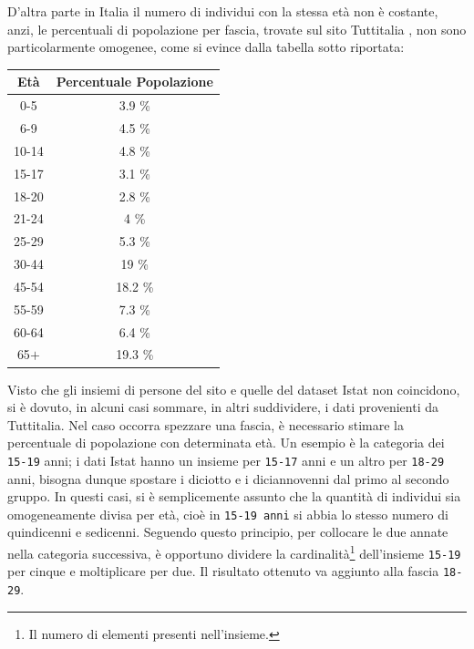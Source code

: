 \documentclass[a4paper]{report}
\newcommand{\columnstyle}[1]{\texttt{#1}}
\begin{document}
D'altra parte in Italia il numero di individui con 
la stessa età non è costante, anzi, le percentuali di popolazione per fascia, 
trovate sul sito Tuttitalia \cite{TUTTITALIA:1}, non sono particolarmente omogenee, 
come si evince dalla tabella sotto riportata: 

\begin{center}
    \def\arraystretch{1.5}%
    \begin{tabular}{ |c|c| } 
    \hline
    Età & Percentuale Popolazione \\ 
    \hline
    \rowcolor{TableGray}
    0-5     & 3.9 \% \\ 
    6-9     & 4.5 \% \\
    \rowcolor{TableGray}
    10-14   & 4.8 \% \\
    15-17   & 3.1 \% \\
    \rowcolor{TableGray}
    18-20   & 2.8 \% \\ 
    21-24   & 4   \% \\
    \rowcolor{TableGray}
    25-29   & 5.3 \% \\
    30-44   & 19  \% \\
    \rowcolor{TableGray}
    45-54   & 18.2 \% \\ 
    55-59   & 7.3 \% \\
    \rowcolor{TableGray}
    60-64   & 6.4 \% \\
    65$+$   & 19.3 \% \\
    \hline
    \end{tabular}
\end{center}

Visto che gli insiemi di persone del sito e quelle del dataset Istat non coincidono, 
si è dovuto, in alcuni casi sommare, in altri suddividere, 
i dati provenienti da Tuttitalia. 
Nel caso occorra spezzare una fascia, è necessario stimare la percentuale 
di popolazione con determinata età. 
Un esempio è la categoria dei \columnstyle{15-19} anni; 
i dati Istat hanno un insieme per \columnstyle{15-17} anni e un altro per 
\columnstyle{18-29} anni, 
bisogna dunque spostare i diciotto e i diciannovenni dal primo al 
secondo gruppo. 
In questi casi, si è semplicemente assunto che la quantità di individui sia omogeneamente 
divisa per età, cioè in \columnstyle{15-19 anni} si abbia lo stesso numero di 
quindicenni e sedicenni. 
Seguendo questo principio, per collocare le due annate nella categoria successiva, 
è opportuno dividere la cardinalità\footnote{Il numero di elementi presenti nell'insieme.} 
dell'insieme \columnstyle{15-19} per cinque e moltiplicare per due. 
Il risultato ottenuto va aggiunto alla fascia \columnstyle{18-29}. 
\end{document}
